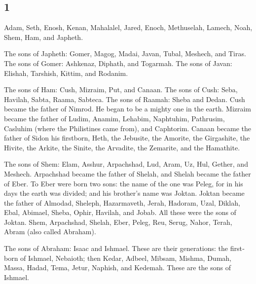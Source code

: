 \begin{paracol}{2}
\switchcolumn
\begin{otherlanguage}{english}

\hypertarget{section-1}{%
\section{1}\label{section-1}}

 Adam, Seth, Enosh,  Kenan, Mahalalel,
Jared,  Enoch, Methuselah, Lamech,  Noah,
Shem, Ham, and Japheth.

 The sons of Japheth: Gomer, Magog, Madai, Javan, Tubal,
Meshech, and Tiras.  The sons of Gomer: Ashkenaz, Diphath,
and Togarmah.  The sons of Javan: Elishah, Tarshish,
Kittim, and Rodanim.

 The sons of Ham: Cush, Mizraim, Put, and Canaan.
 The sons of Cush: Seba, Havilah, Sabta, Raama, Sabteca.
The sons of Raamah: Sheba and Dedan.  Cush became the
father of Nimrod. He began to be a mighty one in the earth.
 Mizraim became the father of Ludim, Anamim, Lehabim,
Naphtuhim,  Pathrusim, Casluhim (where the Philistines
came from), and Caphtorim.  Canaan became the father of
Sidon his firstborn, Heth,  the Jebusite, the Amorite,
the Girgashite,  the Hivite, the Arkite, the Sinite,
 the Arvadite, the Zemarite, and the Hamathite.

 The sons of Shem: Elam, Asshur, Arpachshad, Lud, Aram,
Uz, Hul, Gether, and Meshech.  Arpachshad became the
father of Shelah, and Shelah became the father of Eber. 
To Eber were born two sons: the name of the one was Peleg, for in his
days the earth was divided; and his brother's name was Joktan.
 Joktan became the father of Almodad, Sheleph,
Hazarmaveth, Jerah,  Hadoram, Uzal, Diklah,
 Ebal, Abimael, Sheba,  Ophir, Havilah,
and Jobab. All these were the sons of Joktan.  Shem,
Arpachshad, Shelah,  Eber, Peleg, Reu, 
Serug, Nahor, Terah,  Abram (also called Abraham).

 The sons of Abraham: Isaac and Ishmael. 
These are their generations: the firstborn of Ishmael, Nebaioth; then
Kedar, Adbeel, Mibsam,  Mishma, Dumah, Massa, Hadad,
Tema,  Jetur, Naphish, and Kedemah. These are the sons of
Ishmael.


\end{otherlanguage}
\end{paracol}
